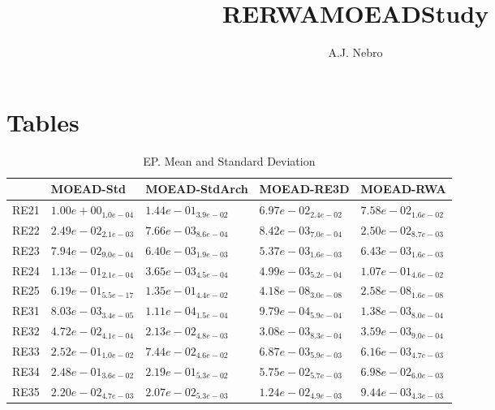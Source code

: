 \documentclass{article}
\title{RERWAMOEADStudy}
\author{A.J. Nebro}
\begin{document}
\maketitle
\section{Tables}

\begin{table}
\caption{EP. Mean and Standard Deviation}
\label{table: EP}
\centering
\begin{scriptsize}
\begin{tabular}{lllll}
\hline & MOEAD-Std & MOEAD-StdArch & MOEAD-RE3D &  MOEAD-RWA\\
\hline 
RE21 & $  1.00e+00_{ 1.0e-04}$ & $  1.44e-01_{ 3.9e-02}$ & \cellcolor{gray95}$  6.97e-02_{ 2.4e-02}$ & \cellcolor{gray25}$  7.58e-02_{ 1.6e-02}$ \\
RE22 & $  2.49e-02_{ 2.1e-03}$ & \cellcolor{gray95}$  7.66e-03_{ 8.6e-04}$ & \cellcolor{gray25}$  8.42e-03_{ 7.0e-04}$ & $  2.50e-02_{ 8.7e-03}$ \\
RE23 & $  7.94e-02_{ 9.0e-04}$ & \cellcolor{gray25}$  6.40e-03_{ 1.9e-03}$ & \cellcolor{gray95}$  5.37e-03_{ 1.6e-03}$ & $  6.43e-03_{ 1.6e-03}$ \\
RE24 & $  1.13e-01_{ 2.1e-04}$ & \cellcolor{gray95}$  3.65e-03_{ 4.5e-04}$ & \cellcolor{gray25}$  4.99e-03_{ 5.2e-04}$ & $  1.07e-01_{ 4.6e-02}$ \\
RE25 & $  6.19e-01_{ 5.5e-17}$ & $  1.35e-01_{ 4.4e-02}$ & \cellcolor{gray25}$  4.18e-08_{ 3.0e-08}$ & \cellcolor{gray95}$  2.58e-08_{ 1.6e-08}$ \\
RE31 & $  8.03e-03_{ 3.4e-05}$ & \cellcolor{gray95}$  1.11e-04_{ 1.5e-04}$ & \cellcolor{gray25}$  9.79e-04_{ 5.9e-04}$ & $  1.38e-03_{ 8.0e-04}$ \\
RE32 & $  4.72e-02_{ 4.1e-04}$ & $  2.13e-02_{ 4.8e-03}$ & \cellcolor{gray95}$  3.08e-03_{ 8.3e-04}$ & \cellcolor{gray25}$  3.59e-03_{ 9.0e-04}$ \\
RE33 & $  2.52e-01_{ 1.0e-02}$ & $  7.44e-02_{ 4.6e-02}$ & \cellcolor{gray25}$  6.87e-03_{ 5.9e-03}$ & \cellcolor{gray95}$  6.16e-03_{ 4.7e-03}$ \\
RE34 & $  2.48e-01_{ 3.6e-02}$ & $  2.19e-01_{ 5.3e-02}$ & \cellcolor{gray95}$  5.75e-02_{ 5.7e-03}$ & \cellcolor{gray25}$  6.98e-02_{ 6.0e-03}$ \\
RE35 & $  2.20e-02_{ 4.7e-03}$ & $  2.07e-02_{ 5.3e-03}$ & \cellcolor{gray25}$  1.24e-02_{ 4.9e-03}$ & \cellcolor{gray95}$  9.44e-03_{ 4.3e-03}$ \\

\end{tabular}
\end{scriptsize}
\end{table}
\end{document}
